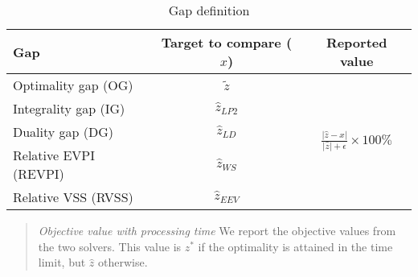 

\begin{table}[H]
	\centering
	\caption{Gap definition}
	\label{table:gap}
	\begin{tabular}{lcc}
		\hline
		Gap   & Target to compare ($x$) & Reported value                                                        \\ \hline
		Optimality gap (OG)   & $\tilde{z}$        & \multirow{5}{*}{$\frac{|\hat{z}-x|}{|\hat{z}|+\epsilon}\times 100\%$} \\
		Integrality gap (IG)   & $\hat{z}_{LP2}$    &                                                                       \\
		Duality gap (DG)   & $\hat{z}_{LD}$     &                                                                       \\
		Relative EVPI (REVPI) & $\hat{z}_{WS}$     &                                                                       \\
		Relative VSS (RVSS)  & $\hat{z}_{EEV}$    &                                                                       \\ \hline
	\end{tabular}
\end{table}

\begin{quote}
	\noindent\textit{Objective value with processing time} We report the objective values from the two solvers. This value is $z^*$ if the optimality is attained in the time limit, but $\hat{z}$ otherwise.
\end{quote}

